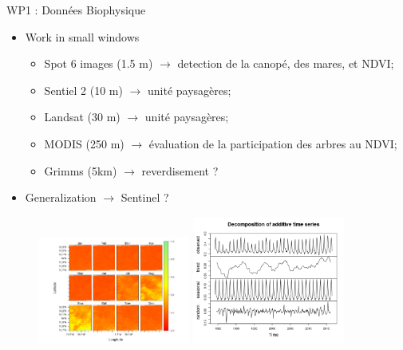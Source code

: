\documentclass[newPxFont]{beamer}
\begin{document}

\begin{frame}[c]{WP1 : Données Biophysique}
\vspace{-2em}
\begin{itemize}
  \item Work in small windows
  \begin{itemize}
    \item Spot 6 images (1.5 m) $\rightarrow$ detection de la canopé, des mares, et NDVI;
    \item Sentiel 2 (10 m) $\rightarrow$ unité paysagères;
    \item Landsat (30 m) $\rightarrow$ unité paysagères;
    \item MODIS (250 m) $\rightarrow$ évaluation de la participation des arbres au NDVI;
    \item Grimms (5km) $\rightarrow$ reverdisement ?
  \end{itemize}
  \item Generalization $\rightarrow$ Sentinel ?
\end{itemize}
\vspace{-1em}
\begin{figure}
	\centering
	\includegraphics[width = 5cm]{img/NDVI2015}
  \includegraphics[width = 5cm]{img/reverdiement}
\end{figure}
\end{frame}
\end{document}
